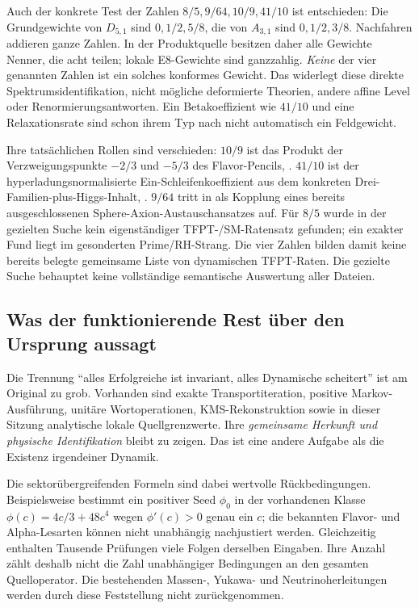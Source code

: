 Auch der konkrete Test der Zahlen $8/5,9/64,10/9,41/10$ ist entschieden: Die Grundgewichte von $D_{5,1}$ sind $0,1/2,5/8$, die von $A_{3,1}$ sind $0,1/2,3/8$. Nachfahren addieren ganze Zahlen. In der Produktquelle besitzen daher alle Gewichte Nenner, die acht teilen; lokale E8-Gewichte sind ganzzahlig. \emph{Keine} der vier genannten Zahlen ist ein solches konformes Gewicht. Das widerlegt diese direkte Spektrumsidentifikation, nicht mögliche deformierte Theorien, andere affine Level oder Renormierungsantworten. Ein Betakoeffizient wie $41/10$ und eine Relaxationsrate sind schon ihrem Typ nach nicht automatisch ein Feldgewicht.

Ihre tatsächlichen Rollen sind verschieden: $10/9$ ist das Produkt der Verzweigungspunkte $-2/3$ und $-5/3$ des Flavor-Pencils, . $41/10$ ist der hyperladungsnormalisierte Ein-Schleifenkoeffizient aus dem konkreten Drei-Familien-plus-Higgs-Inhalt, . $9/64$ tritt in  als Kopplung eines bereits ausgeschlossenen Sphere-Axion-Austauschansatzes auf. Für $8/5$ wurde in der gezielten Suche kein eigenständiger TFPT-/SM-Ratensatz gefunden; ein exakter Fund liegt im gesonderten Prime/RH-Strang. Die vier Zahlen bilden damit keine bereits belegte gemeinsame Liste von dynamischen TFPT-Raten. Die gezielte Suche behauptet keine vollständige semantische Auswertung aller Dateien.

\subsection*{Was der funktionierende Rest über den Ursprung aussagt}
Die Trennung ``alles Erfolgreiche ist invariant, alles Dynamische scheitert'' ist am Original zu grob. Vorhanden sind exakte Transportiteration, positive Markov-Ausführung, unitäre Wortoperationen, KMS-Rekonstruktion sowie in dieser Sitzung analytische lokale Quellgrenzwerte. Ihre \emph{gemeinsame Herkunft und physische Identifikation} bleibt zu zeigen. Das ist eine andere Aufgabe als die Existenz irgendeiner Dynamik.

Die sektorübergreifenden Formeln sind dabei wertvolle Rückbedingungen. Beispielsweise bestimmt ein positiver Seed $\phi_0$ in der vorhandenen Klasse $\phi(c)=4c/3+48c^4$ wegen $\phi'(c)>0$ genau ein $c$; die bekannten Flavor- und Alpha-Lesarten können nicht unabhängig nachjustiert werden. Gleichzeitig enthalten Tausende Prüfungen viele Folgen derselben Eingaben. Ihre Anzahl zählt deshalb nicht die Zahl unabhängiger Bedingungen an den gesamten Quelloperator. Die bestehenden Massen-, Yukawa- und Neutrinoherleitungen werden durch diese Feststellung nicht zurückgenommen.


